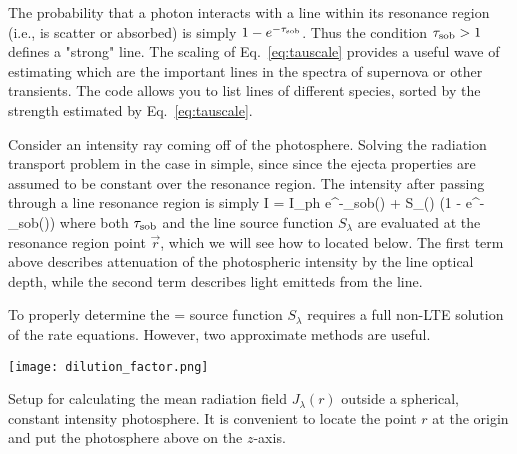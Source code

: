 \documentclass{tufte-handout}
\begin{document}
\comment The probability  that  a photon interacts with a line within its resonance region (i.e., is scatter or absorbed) is simply
$1 - e^{-\tau_{\rm sob}}$. Thus the condition $\tau_{\rm sob} > 1$ defines a "strong" line.  The
scaling of Eq.~\ref{eq:tauscale} provides a useful wave of estimating which are the important
lines in the spectra of supernova or other transients. The   code allows you to list lines of different species, sorted by the strength
estimated by Eq.~\ref{eq:tauscale}.




 Consider an intensity ray coming off of the photosphere. Solving the radiation
transport problem in the case in simple, since since the ejecta properties are assumed to be constant over the resonance region. The intensity after passing through
a line resonance region is simply
\beq
I = I_{\rm ph} e^{-\tau_{\rm sob}()} + S_\lambda() (1 - e^{-\tau_{\rm sob}()})
\eeq
where both $\tau_{\rm sob}$ and the line source function $S_\lambda$ are evaluated at the resonance region point $\vec{r}$, which we will see how to located below.
The first term above describes attenuation of the photospheric intensity by
the line optical depth, while the second term describes light emitteds from the line.

 To properly determine the = source function $S_\lambda$ requires a full non-LTE solution
of the rate equations. However, two approximate methods are useful.


\begin{marginfigure}
\texttt{[image: dilution\_factor.png]}
\caption{Setup for calculating the mean radiation field $J_\lambda(r)$ outside
a spherical, constant intensity photosphere. It is convenient to locate the point $r$ at
the origin and put the photosphere above on the $z$-axis. \label{fig:dilution}}
\end{marginfigure}
\end{document}
